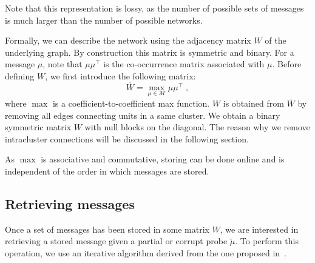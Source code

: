 \documentclass[english,10pt,twocolumn]{IEEEtran}
\renewcommand{\le}{\leqslant}
\theoremstyle{definition}
\begin{document}
	Note that this representation is lossy, as the number of possible sets of messages is much larger than the number of possible networks.
	
	
	Formally, we can describe the network using the adjacency matrix $W$ of the underlying graph. By construction this matrix is symmetric and binary. For a message $\mu$, note that $\mu \mu^{\intercal}$ is the co-occurrence matrix associated with $\mu$. Before defining $W$, we first introduce the following matrix:
\[
	\overline{W} = \max_{\mu\in \mathcal{M}} \mu \mu^{\intercal} %
        \;,
\]
where $\max$ is a coefficient-to-coefficient max function. $W$ is obtained from $\overline{W}$ by removing all edges connecting units in a same cluster. We obtain a binary symmetric matrix $W$ with null blocks on the diagonal. The reason why we remove intracluster connections will be discussed in the following section.


	
  
  
  
  As $\max$ is associative and commutative, storing can be done online and is independent of the order in which messages are stored.
		
	\subsection{Retrieving messages}	
		
        Once a set of messages has been stored in some matrix $W$, we are interested in retrieving a stored message given a partial or corrupt probe $\tilde{\mu}$. To perform this operation, we use an iterative algorithm derived from the one proposed in~\cite{GriBer20117}.
		
%		
%	
		
\end{document}

